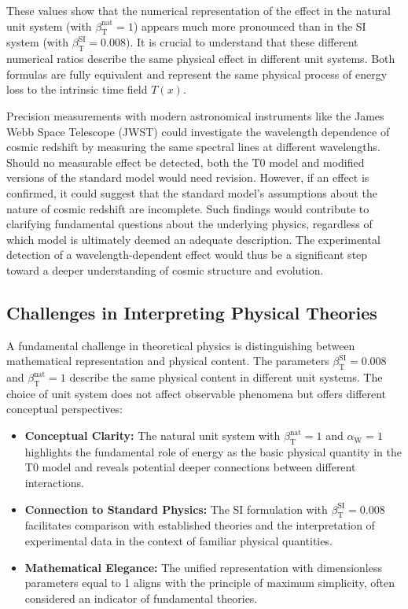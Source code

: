 \documentclass[12pt,a4paper]{article}
\newcommand{\Tfield}{T(x)}
\newcommand{\betaT}{\beta_{\text{T}}}
\newcommand{\alphaW}{\alpha_{\text{W}}}
\begin{document}
	These values show that the numerical representation of the effect in the natural unit system (with \(\betaT^{\text{nat}} = 1\)) appears much more pronounced than in the SI system (with \(\betaT^{\text{SI}} = 0.008\)). It is crucial to understand that these different numerical ratios describe the same physical effect in different unit systems. Both formulas are fully equivalent and represent the same physical process of energy loss to the intrinsic time field \(\Tfield\).
	
	Precision measurements with modern astronomical instruments like the James Webb Space Telescope (JWST) could investigate the wavelength dependence of cosmic redshift by measuring the same spectral lines at different wavelengths. Should no measurable effect be detected, both the T0 model and modified versions of the standard model would need revision. However, if an effect is confirmed, it could suggest that the standard model’s assumptions about the nature of cosmic redshift are incomplete. Such findings would contribute to clarifying fundamental questions about the underlying physics, regardless of which model is ultimately deemed an adequate description. The experimental detection of a wavelength-dependent effect would thus be a significant step toward a deeper understanding of cosmic structure and evolution.
	
	\subsection{Challenges in Interpreting Physical Theories}
	
	A fundamental challenge in theoretical physics is distinguishing between mathematical representation and physical content. The parameters \(\betaT^{\text{SI}} = 0.008\) and \(\betaT^{\text{nat}} = 1\) describe the same physical content in different unit systems. The choice of unit system does not affect observable phenomena but offers different conceptual perspectives:
	
	\begin{itemize}
		\item \textbf{Conceptual Clarity:} The natural unit system with \(\betaT^{\text{nat}} = 1\) and \(\alphaW = 1\) highlights the fundamental role of energy as the basic physical quantity in the T0 model and reveals potential deeper connections between different interactions.
		\item \textbf{Connection to Standard Physics:} The SI formulation with \(\betaT^{\text{SI}} = 0.008\) facilitates comparison with established theories and the interpretation of experimental data in the context of familiar physical quantities.
		\item \textbf{Mathematical Elegance:} The unified representation with dimensionless parameters equal to 1 aligns with the principle of maximum simplicity, often considered an indicator of fundamental theories.
	\end{itemize}
	
\end{document}
